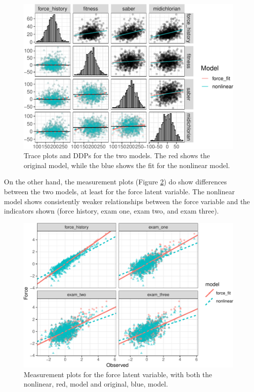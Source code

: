 \documentclass[
  english,
  doc]{apa6}
\begin{document}
\begin{figure}
\centering
\includegraphics{flexplavaan_draft_files/figure-latex/tracenl-1.pdf}
\caption{\label{fig:tracenl}Trace plots and DDPs for the two models. The red shows the original model, while the blue shows the fit for the nonlinear model.}
\end{figure}

On the other hand, the measurement plots (Figure \ref{fig:measnl}) do show differences between the two models, at least for the force latent variable. The nonlinear model shows consistently weaker relationships between the force variable and the indicators shown (force history, exam one, exam two, and exam three).

\begin{figure}
\centering
\includegraphics{flexplavaan_draft_files/figure-latex/measnl-1.pdf}
\caption{\label{fig:measnl}Measurement plots for the force latent variable, with both the nonlinear, red, model and original, blue, model.}
\end{figure}
\end{document}
